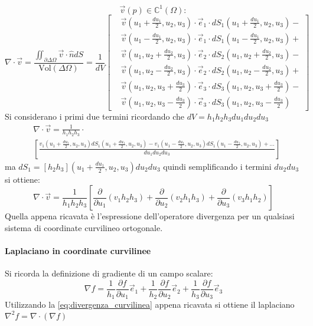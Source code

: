 $$
\vec{v}(p) \in \mathbb{C}^1(\Omega) :
$$
$$
\nabla\cdot\vec{v} = \frac{\iint_{\partial\Delta\Omega}\vec{v}\cdot\hat{n}dS}{\text{Vol}(\Delta \Omega)}
= \frac{1}{dV} \left[\begin{aligned}
&\vec{v}\left(u_1+\frac{du_1}{2},u_2,u_3\right)\cdot\vec{e}_1\cdot
dS_1\left(u_1+\frac{du_1}{2},u_2,u_3\right) - \\
&\vec{v}\left(u_1-\frac{du_1}{2},u_2,u_3\right)\cdot\vec{e}_1\cdot
dS_1\left(u_1-\frac{du_1}{2},u_2,u_3\right) + \\
&\vec{v}\left(u_1,u_2+\frac{du_2}{2},u_3\right)\cdot\vec{e}_2\cdot
dS_2\left(u_1,u_2+\frac{du_2}{2},u_3\right)  - \\
&\vec{v} \left(u_1,u_2-\frac{du_2}{2},u_3\right)\cdot\vec{e}_2\cdot
dS_2\left(u_1,u_2-\frac{du_2}{2},u_3\right) + \\
&\vec{v} \left(u_1,u_2,u_3+\frac{du_3}{2}\right)\cdot\vec{e}_3\cdot
dS_3\left(u_1,u_2,u_3+\frac{du_3}{2}\right) - \\
&\vec{v} \left(u_1,u_2,u_3-\frac{du_3}{2}\right)\cdot\vec{e}_3\cdot
dS_3\left(u_1,u_2,u_3-\frac{du_3}{2}\right)
\end{aligned} \right]
$$
Si considerano i primi due termini ricordando che $dV = h_1h_2h_3du_1du_2du_3$
$$
\begin{aligned}
&\nabla\cdot\vec{v} = \frac{1}{h_1h_2h_3} \cdot \\
&\left[\frac{v_1(u_1+\frac{du_1}{2},u_2,u_3)dS_1(u_1+\frac{du_1}{2},u_2,u_3) - v_1(u_1-\frac{du_1}{2},u_2,u_3)dS_1(u_1-\frac{du_1}{2},u_2,u_3)+...}{du_1du_2du_3}\right]
\end{aligned}
$$
ma $dS_1 = [h_2h_3](u_1+\frac{du_1}{2},u_2,u_3)du_2du_3$
quindi semplificando i termini $du_2du_3$ si ottiene:
\begin{equation}
\nabla\cdot\vec{v} = \frac{1}{h_1h_2h_3}\left[\frac{\partial}{\partial u_1}(v_1h_2h_3) +
\frac{\partial}{\partial u_2}(v_2h_1h_3) + \frac{\partial}{\partial u_3}(v_3h_1h_2)\right]
\label{eq:divergenza_curvilinea}
\end{equation}
Quella appena ricavata è l'espressione dell'operatore divergenza per un qualsiasi 
sistema di coordinate curvilineo ortogonale.

\paragraph{Laplaciano in coordinate curvilinee}
Si ricorda la definizione di gradiente di un campo scalare:
$$
\nabla f = \frac{1}{h_1} \frac{\partial f}{\partial u_1} \vec{e}_1 +
\frac{1}{h_2} \frac{\partial f}{\partial u_2} \vec{e}_2 + 
\frac{1}{h_3} \frac{\partial f}{\partial u_3} \vec{e}_3
$$
Utilizzando la \ref{eq:divergenza_curvilinea} appena ricavata si ottiene il laplaciano $\nabla^2 f = \nabla\cdot(\nabla f) $

